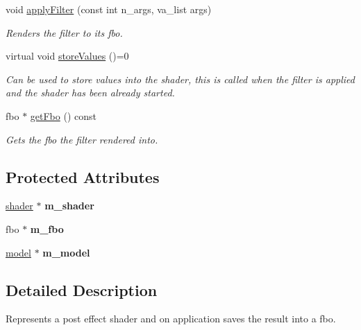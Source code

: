 \begin{DoxyCompactItemize}
void \hyperlink{classflounder_1_1ipostfilter_a59407e666a5f2ae9767b9fc0f0e25ced}{apply\+Filter} (const int n\+\_\+args, va\+\_\+list args)
\begin{DoxyCompactList}\small\item\em Renders the filter to its fbo. \end{DoxyCompactList}\item 
virtual void \hyperlink{classflounder_1_1ipostfilter_a9b658b4672718d5ac36539875bde722e}{store\+Values} ()=0
\begin{DoxyCompactList}\small\item\em Can be used to store values into the shader, this is called when the filter is applied and the shader has been already started. \end{DoxyCompactList}\item 
fbo $\ast$ \hyperlink{classflounder_1_1ipostfilter_ae074e279e1e3c6ddea5df8530802b08b}{get\+Fbo} () const
\begin{DoxyCompactList}\small\item\em Gets the fbo the filter rendered into. \end{DoxyCompactList}\end{DoxyCompactItemize}
\subsection*{Protected Attributes}
\begin{DoxyCompactItemize}
\item 
\mbox{\label{classflounder_1_1ipostfilter_ab197a81f28df26a38b3302914d6f42fc}} 
\hyperlink{classflounder_1_1shader}{shader} $\ast$ {\bfseries m\+\_\+shader}
\item 
\mbox{\label{classflounder_1_1ipostfilter_a654b609c29c61f0232126d47de77b00a}} 
fbo $\ast$ {\bfseries m\+\_\+fbo}
\item 
\mbox{\label{classflounder_1_1ipostfilter_abf1adae588040bf18dd205f9296f92db}} 
\hyperlink{classflounder_1_1model}{model} $\ast$ {\bfseries m\+\_\+model}
\end{DoxyCompactItemize}


\subsection{Detailed Description}
Represents a post effect shader and on application saves the result into a fbo. 



